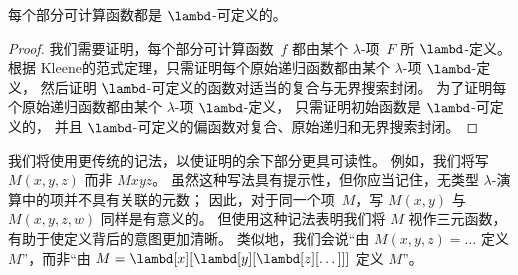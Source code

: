 \documentclass[../../../include/open-logic-section]{subfiles}
\begin{document}

\begin{thm}
每个部分可计算函数都是 $\lambd$-可定义的。
\end{thm}

\begin{proof}
我们需要证明，每个部分可计算函数~$f$ 都由某个 $\lambda$-项~$F$ 所 $\lambd$-定义。
根据 Kleene的范式定理，只需证明每个原始递归函数都由某个 $\lambda$-项 $\lambd$-定义，
然后证明 $\lambd$-可定义的函数对适当的复合与无界搜索封闭。
为了证明每个原始递归函数都由某个 $\lambda$-项 $\lambd$-定义，
只需证明初始函数是 $\lambd$-可定义的，
并且 $\lambd$-可定义的偏函数对复合、原始递归和无界搜索封闭。
\end{proof}

我们将使用更传统的记法，以使证明的余下部分更具可读性。
例如，我们将写 $M(x, y, z)$ 而非 $Mxyz$。
虽然这种写法具有提示性，但你应当记住，无类型 $\lambda$-演算中的项并不具有关联的元数；
因此，对于同一个项~$M$，写 $M(x,y)$ 与 $M(x,y,z,w)$ 同样是有意义的。
但使用这种记法表明我们将 $M$ 视作三元函数，有助于使定义背后的意图更加清晰。
类似地，我们会说“由 $M(x,y,z) = \dots$ 定义 $M$”，而非“由 $M =
\lambd[x][\lambd[y][\lambd[z][\dots]]]$ 定义 $M$”。
\end{document}
